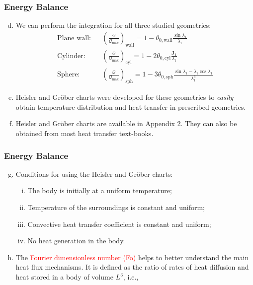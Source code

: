 \documentclass[10pt,compress]{beamer}
\newcommand{\frc}{\displaystyle\frac}
\newcommand{\red}{\textcolor{red}}
\begin{document}
\begin{frame}
 \frametitle{Energy Balance}
   \begin{enumerate}[(a)]\setcounter{enumi}{3}%
     \item<1-> We can perform the integration for all three  studied geometries:
          \begin{eqnarray}
            \text{Plane wall:} && \left(\frc{\mathcal{Q}}{\mathcal{Q}_{\text{max}}}\right)_{\text{wall}} = 1 - \theta_{0,\text{wall}}\frc{\sin{\lambda_{1}}}{\lambda_{1}} \\
            \text{Cylinder:} && \left(\frc{\mathcal{Q}}{\mathcal{Q}_{\text{max}}}\right)_{\text{cyl}} = 1- 2\theta_{0,\text{cyl}}\frc{\mathbf{J_{1}}}{\lambda_{1}} \\
            \text{Sphere:} && \left(\frc{\mathcal{Q}}{\mathcal{Q}_{\text{max}}}\right)_{\text{sph}} = 1 - 3\theta_{0,\text{sph}}\frc{\sin{\lambda_{1}}-\lambda_{1}\cos{\lambda_{1}}}{\lambda_{1}^{3}}
          \end{eqnarray}
      \item<2-> Heisler and Gr\"ober charts were developed for these geometries to {\it easily} obtain temperature distribution and heat transfer in prescribed geometries. 
      \item<3-> Heisler and Gr\"ober charts are available in Appendix 2. They can also be obtained from most heat transfer text-books.      
   \end{enumerate} 
\end{frame}

\begin{frame}
 \frametitle{Energy Balance}
   \begin{enumerate}[(a)]\setcounter{enumi}{6}%
     \item<1-> Conditions for using the Heisler and Gr\"ober charts:
        \begin{enumerate}[(i)]
           \item<2-> The body is initially at a uniform temperature;
           \item<2-> Temperature of the surroundings is constant and uniform;
           \item<2-> Convective heat transfer coefficient is constant and uniform;
           \item<2-> No heat generation in the body.
        \end{enumerate}
     \item<3-> The \red{Fourier dimensionless number (Fo)} helps to better understand the main heat flux mechanisms. It is defined as the ratio of rates of heat diffusion and heat stored in a body of volume $L^{3}$, i.e.,
        \visible<3->{\begin{equation}
               Fo = \frc{\alpha t}{L^{2}}
        \end{equation}} 
   \end{enumerate} 
\end{frame}
\end{document}
